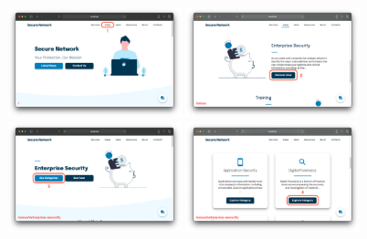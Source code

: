 \documentclass[12pt]{report}
\begin{document}
\begin{figure}[H]
	\centering
	\includegraphics[width=0.45\textwidth]{scenarios/1/1.png}
	\includegraphics[width=0.45\textwidth]{scenarios/1/2.png}
	\includegraphics[width=0.45\textwidth]{scenarios/1/3.png}
	\includegraphics[width=0.45\textwidth]{scenarios/1/4.png}
\end{figure}
\end{document}
